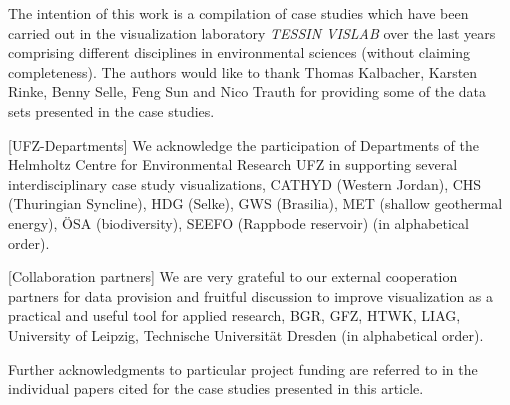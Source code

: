 \documentclass[twocolumn]{svjour3}          %
\begin{document}
\begin{acknowledgements}
The intention of this work is a compilation of case studies which have been carried out in the visualization laboratory \emph{TESSIN VISLAB} over the last years comprising different disciplines in environmental sciences (without claiming completeness). The authors would like to thank Thomas Kalbacher, Karsten Rinke, Benny Selle, Feng Sun and Nico Trauth for providing some of the data sets presented in the case studies.

[UFZ-Departments] We acknowledge the participation of Departments of the Helmholtz Centre for Environmental Research UFZ in supporting several interdisciplinary case study visualizations, CATHYD (Western Jordan), CHS (Thuringian Syncline), HDG (Selke), GWS (Brasilia), MET (shallow geothermal energy), ÖSA (biodiversity), SEEFO (Rappbode reservoir) (in alphabetical order).

[Collaboration partners] We are very grateful to our external cooperation partners for data provision and fruitful discussion to improve visualization as a practical and useful tool for applied research, BGR, GFZ, HTWK, LIAG, University of Leipzig, Technische Universität Dresden (in alphabetical order).


Further acknowledgments to particular project funding are referred to in the individual papers cited for the case studies presented in this article.
\end{acknowledgements}

\end{document}
